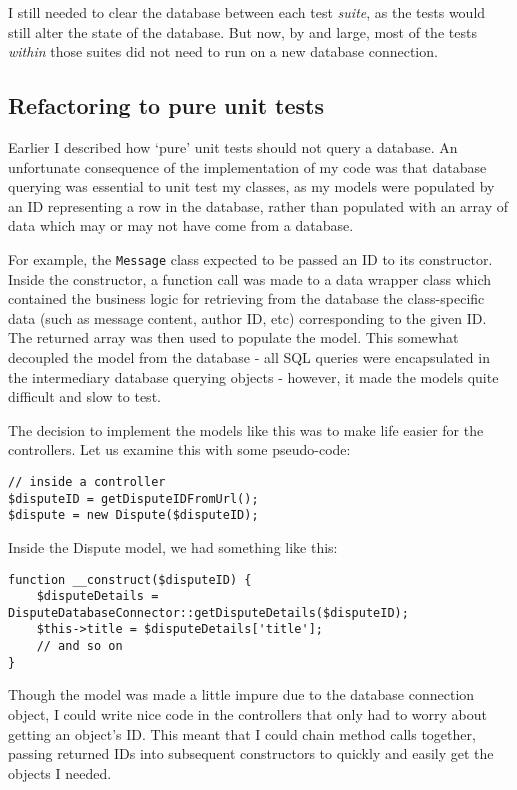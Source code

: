 I still needed to clear the database between each test \emph{suite}, as the tests would still alter the state of the database. But now, by and large, most of the tests \emph{within} those suites did not need to run on a new database connection.

\subsection{Refactoring to pure unit tests}

Earlier I described how `pure' unit tests should not query a database. An unfortunate consequence of the implementation of my code was that database querying was essential to unit test my classes, as my models were populated by an ID representing a row in the database, rather than populated with an array of data which may or may not have come from a database.

For example, the \lstinline{Message} class expected to be passed an ID to its constructor. Inside the constructor, a function call was made to a data wrapper class which contained the business logic for retrieving from the database the class-specific data (such as message content, author ID, etc) corresponding to the given ID. The returned array was then used to populate the model. This somewhat decoupled the model from the database - all SQL queries were encapsulated in the intermediary database querying objects - however, it made the models quite difficult and slow to test.

The decision to implement the models like this was to make life easier for the controllers. Let us examine this with some pseudo-code:

\begin{lstlisting}
// inside a controller
$disputeID = getDisputeIDFromUrl();
$dispute = new Dispute($disputeID);
\end{lstlisting}

Inside the Dispute model, we had something like this:

\begin{minipage}{\textwidth}
\begin{lstlisting}
function __construct($disputeID) {
    $disputeDetails = DisputeDatabaseConnector::getDisputeDetails($disputeID);
    $this->title = $disputeDetails['title'];
    // and so on
}
\end{lstlisting}
\end{minipage}

Though the model was made a little impure due to the database connection object, I could write nice code in the controllers that only had to worry about getting an object's ID. This meant that I could chain method calls together, passing returned IDs into subsequent constructors to quickly and easily get the objects I needed.

